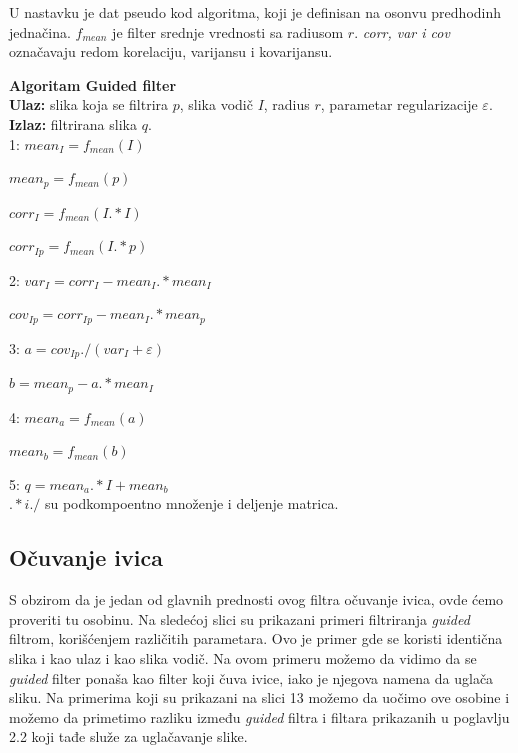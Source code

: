 \documentclass[a4paper,12pt,titlepage]{article}
\begin{document}
U nastavku je dat pseudo kod algoritma, koji je definisan na osonvu predhodinh jednačina. $f_{mean}$ je filter srednje vrednosti sa radiusom $r$. \emph{corr, var i cov} označavaju redom korelaciju, varijansu i kovarijansu. 

\textbf{Algoritam Guided filter}\\

\textbf{Ulaz:} slika koja se filtrira $p$, slika vodič $I$, radius $r$, parametar regularizacije $\varepsilon$.\\

\textbf{Izlaz:} filtrirana slika $q$.\\

1: $mean_I = f_{mean}(I)$

\hspace{4mm} $mean_p = f_{mean}(p)$

\hspace{4mm} $corr_I = f_{mean}(I .* I)$

\hspace{4mm} $corr_{Ip} = f_{mean}(I .* p)$

2: $var_I = corr_I - mean_I .* mean_I$

\hspace{4mm}  $cov_{Ip} = corr_{Ip} - mean_I .* mean_p$

3: $a = cov_{Ip} ./ (var_I + \varepsilon)$

\hspace{4mm} $b = mean_p - a .*  mean_I$

4: $mean_a = f_{mean}(a)$

\hspace{4mm} $mean_b = f_{mean}(b)$

5: $q = mean_a .* I + mean_b$\\

$ .*  i  ./ $ su podkompoentno množenje i deljenje matrica.


\subsection{Očuvanje ivica}%

S obzirom da je jedan od glavnih prednosti ovog filtra očuvanje ivica, ovde ćemo proveriti tu osobinu. Na sledećoj slici su prikazani primeri filtriranja \emph{guided} filtrom, korišćenjem različitih parametara. Ovo je primer gde se koristi identična slika i kao ulaz i kao slika vodič. Na ovom primeru možemo da vidimo da se \emph{guided} filter ponaša kao filter koji čuva ivice, iako je njegova namena da uglača sliku. 
Na primerima koji su prikazani na slici 13 možemo da uočimo ove osobine i možemo da primetimo razliku između \emph{guided} filtra i filtara prikazanih u poglavlju 2.2 koji tađe služe za uglačavanje slike.
\end{document}
